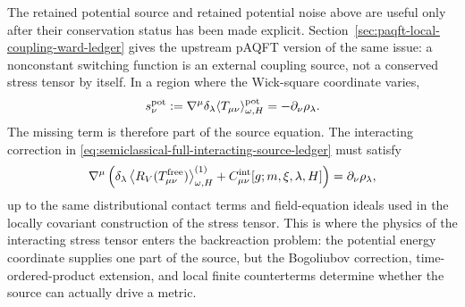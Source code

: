 The retained potential source and retained potential noise above are useful only
after their conservation status has been made explicit.
Section~\ref{sec:paqft-local-coupling-ward-ledger} gives the upstream pAQFT
version of the same issue: a nonconstant switching function is an external
coupling source, not a conserved stress tensor by itself.  In a region where
the Wick-square coordinate varies,
\begin{equation}
  s_\nu^{\rm pot}
  :=
  \nabla^\mu
  \delta_\lambda\langle T_{\mu\nu}\rangle_{\omega,H}^{\rm pot}
  =
  -\partial_\nu\rho_\lambda .
  \label{eq:semiclassical-potential-source-divergence}
\end{equation}
The missing term is therefore part of the source equation.  The interacting
correction in
\eqref{eq:semiclassical-full-interacting-source-ledger} must satisfy
\begin{equation}
  \nabla^\mu
  \left(
    \delta_\lambda
    \left\langle R_V(T_{\mu\nu}^{\rm free})\right\rangle_{\omega,H}^{(1)}
    +
    C_{\mu\nu}^{\rm int}[g;m,\xi,\lambda,H]
  \right)
  =
  \partial_\nu\rho_\lambda ,
  \label{eq:semiclassical-interacting-ward-diagnostic-source-equation}
\end{equation}
up to the same distributional contact terms and field-equation ideals used in
the locally covariant construction of the stress tensor.  This is where the
physics of the interacting stress tensor enters the backreaction problem: the
potential energy coordinate supplies one part of the source, but the
Bogoliubov correction, time-ordered-product extension, and local finite
counterterms determine whether the source can actually drive a metric.

